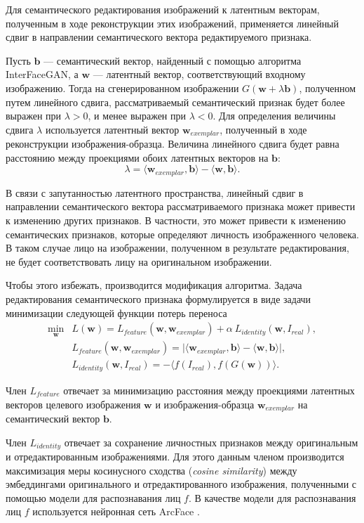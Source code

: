 Для семантического редактирования изображений к латентным векторам, полученным в ходе реконструкции этих изображений, применяется линейный сдвиг в направлении семантического вектора редактируемого признака.

Пусть $\mathbf b$ --- семантический вектор, найденный с помощью алгоритма InterFaceGAN, а $\mathbf w$ --- латентный вектор, соответствующий входному изображению.
Тогда на сгенерированном изображении $G(\mathbf w + \lambda \mathbf b)$, полученном путем линейного сдвига, рассматриваемый семантический признак будет более выражен при $\lambda > 0$, и менее выражен при $\lambda  < 0$.
Для определения величины сдвига $\lambda$ используется латентный вектор $\mathbf w_{exemplar}$, полученный в ходе реконструкции изображения-образца. 
Величина линейного сдвига будет равна расстоянию между проекциями обоих латентных векторов на $\mathbf b$: 
$$\lambda = \langle \mathbf w_{exemplar}, \mathbf b \rangle - \langle \mathbf w, \mathbf b \rangle .$$

В связи с запутанностью латентного пространства, линейный сдвиг в направлении семантического вектора рассматриваемого признака может привести к изменению других признаков. 
В частности, это может привести к изменению семантических признаков, которые определяют личность изображенного человека. 
В таком случае лицо на изображении, полученном в результате редактирования, не будет соответствовать лицу на оригинальном изображении.

Чтобы этого избежать, производится модификация алгоритма. 
Задача редактирования семантического признака формулируется в виде задачи минимизации следующей функции потерь переноса
\begin{align*}
\min_{\mathbf w} &L(\mathbf w) = L_{feature}(\mathbf w, \mathbf w_{exemplar}) + \alpha~L_{identity}(\mathbf w, I_{real}), \\
&L_{feature}(\mathbf w, \mathbf w_{exemplar}) = \lvert \langle \mathbf w_{exemplar}, \mathbf b \rangle - \langle \mathbf w, \mathbf b \rangle \rvert,\\
&L_{identity}(\mathbf w, I_{real}) = - \langle f(I_{real}), f(G(\mathbf w)) \rangle.
\end{align*}

Член $L_{feature}$ отвечает за минимизацию расстояния между проекциями латентных векторов целевого изображения $\mathbf w$ и изображения-образца $\mathbf w_{exemplar}$ на семантический вектор $\mathbf b$.

Член $L_{identity}$ отвечает за сохранение личностных признаков между оригинальным и отредактированным изображениями. Для этого данным членом производится максимизация меры косинусного сходства (\emph{cosine similarity}) между эмбеддингами оригинального и отредактированного изображения, полученными с помощью модели для распознавания лиц $f$.
В качестве модели для распознавания лиц $f$ используется нейронная сеть ArcFace \cite{deng2018arcface}.


